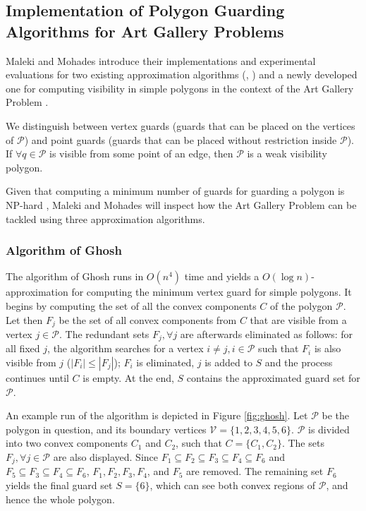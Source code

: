\subsection{Implementation of Polygon Guarding Algorithms for Art Gallery Problems \cite{maleki2022implementation}}
Maleki and Mohades \cite{maleki2022implementation} introduce their implementations and experimental evaluations for two existing approximation algorithms (\cite{GHOSH2010718}, \cite{bhattacharya2016approximability}) and a newly developed one for computing visibility in simple polygons in the context of the Art Gallery Problem \cite{o1987art}.

We distinguish between vertex guards (guards that can be placed on the vertices of $\mathcal P$) and point guards (guards that can be placed without restriction inside $\mathcal P$). If $\forall q \in \mathcal P$ is visible from some point of an edge, then $\mathcal P$ is a weak visibility polygon.

Given that computing a minimum number of guards for guarding a polygon is NP-hard \cite{1057165}, Maleki and Mohades will inspect how the Art Gallery Problem \cite{o1987art} can be tackled using three approximation algorithms.

\subsubsection{Algorithm of Ghosh \cite{GHOSH2010718}}
The algorithm of Ghosh \cite{GHOSH2010718} runs in $O(n^4)$ time and yields a $O(\log n)$-approximation for computing the minimum vertex guard for simple polygons. It begins by  computing the set of all the convex components $C$ of the polygon $\mathcal P$. Let then $F_j$ be the set of all convex components from $C$ that are visible from a vertex $j \in \mathcal P$. The redundant sets $F_j, \forall j$ are afterwards eliminated as follows: for all fixed $j$, the algorithm searches for a vertex $i \neq j, i \in \mathcal P$ such that $F_i$ is also visible from $j$ ($|F_i| \leq |F_j|$); $F_i$ is eliminated, $j$ is added to $S$ and the process continues until $C$ is empty. At the end, $S$ contains the approximated guard set for $\mathcal P$.

An example run of the algorithm is depicted in Figure \ref{fig:ghosh}. Let $\mathcal P$ be the polygon in question, and its boundary vertices $\mathcal V = \{1, 2, 3, 4, 5, 6\}$. $\mathcal P$ is divided into two convex components $C_1$ and $C_2$, such that $C = \{C_1, C_2\}$. The sets $F_j, \forall j \in \mathcal P$ are also displayed. Since $F_1 \subseteq F_2 \subseteq F_3 \subseteq F_4 \subseteq F_6$ and $F_5 \subseteq F_3 \subseteq F_4 \subseteq F_6$, $F_1, F_2, F_3, F_4$, and $F_5$ are removed. The remaining set $F_6$ yields the final guard set $S = \{6\}$, which can see both convex regions of $\mathcal P$, and hence the whole polygon.

